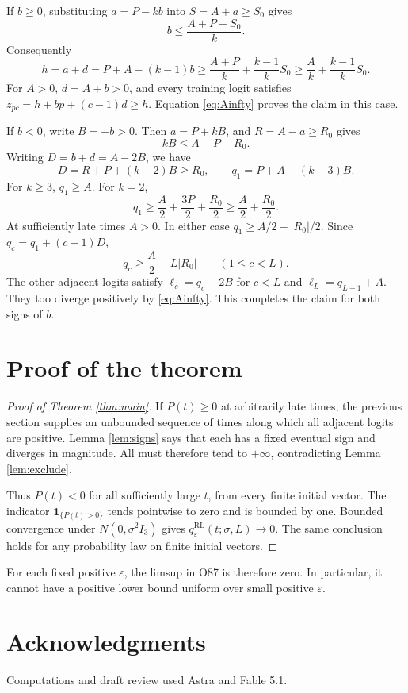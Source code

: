 \documentclass[11pt]{article}
\newcommand{\eps}{\varepsilon}
\begin{document}
If $b\ge0$, substituting $a=P-kb$ into $S=A+a\ge S_0$ gives
\[
 b\le\frac{A+P-S_0}{k}.
\]
Consequently
\begin{equation}\label{eq:casepositive}
 h=a+d=P+A-(k-1)b
 \ge\frac{A+P}{k}+\frac{k-1}{k}S_0
 \ge\frac Ak+\frac{k-1}{k}S_0.
\end{equation}
For $A>0$, $d=A+b>0$, and every training logit satisfies
$z_{pc}=h+bp+(c-1)d\ge h$. Equation \eqref{eq:Ainfty} proves the claim
in this case.

If $b<0$, write $B=-b>0$. Then $a=P+kB$, and $R=A-a\ge R_0$ gives
\[
 kB\le A-P-R_0.
\]
Writing $D=b+d=A-2B$, we have
\[
 D=R+P+(k-2)B\ge R_0,\qquad q_1=P+A+(k-3)B.
\]
For $k\ge3$, $q_1\ge A$. For $k=2$,
\[
 q_1\ge\frac A2+\frac{3P}{2}+\frac{R_0}{2}
       \ge\frac A2+\frac{R_0}{2}.
\]
At sufficiently late times $A>0$. In either case $q_1\ge A/2-|R_0|/2$. Since $q_c=q_1+(c-1)D$,
\begin{equation}\label{eq:casenegative}
 q_c\ge\frac A2-L|R_0|\qquad(1\le c<L).
\end{equation}
The other adjacent logits satisfy $\ell_c=q_c+2B$ for $c<L$ and
$\ell_L=q_{L-1}+A$. They too diverge positively by \eqref{eq:Ainfty}.
This completes the claim for both signs of $b$.

\section{Proof of the theorem}
\begin{proof}[Proof of Theorem \ref{thm:main}]
If $P(t)\ge0$ at arbitrarily late times, the previous section supplies an
unbounded sequence of times along which all adjacent logits are positive.
Lemma \ref{lem:signs} says that each has a fixed eventual sign and diverges in
magnitude. All must therefore tend to $+\infty$, contradicting
Lemma \ref{lem:exclude}.

Thus $P(t)<0$ for all sufficiently large $t$, from every finite initial
vector. The indicator $\mathbf1_{\{P(t)>0\}}$ tends pointwise to zero and
is bounded by one. Bounded convergence under $N(0,\sigma^2I_3)$ gives
$q^{\mathrm{RL}}_\eps(t;\sigma,L)\to0$. The same conclusion holds for any
probability law on finite initial vectors.
\end{proof}
For each fixed positive $\eps$, the limsup in O87 is therefore zero.
In particular, it cannot have a positive lower bound uniform over small
positive $\eps$.

\section*{Acknowledgments}
Computations and draft review used Astra and Fable 5.1.
\end{document}
